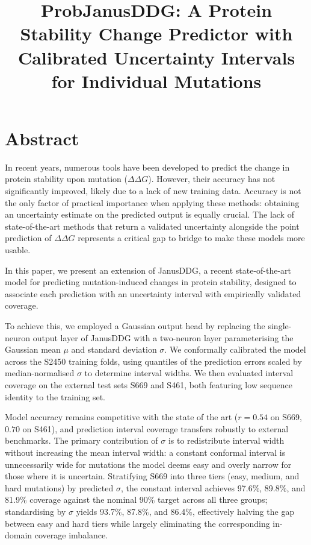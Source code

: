 \documentclass[11pt,a4paper]{article}
\title{ProbJanusDDG: A Protein Stability Change Predictor with Calibrated Uncertainty Intervals for Individual Mutations}
\author{}
\begin{document}
\maketitle
\vspace{-10mm}




\section{Abstract}
In recent years, numerous tools have been developed to predict the change in protein stability upon mutation ($\Delta\Delta G$). However, their accuracy has not significantly improved, likely due to a lack of new training data. Accuracy is not the only factor of practical importance when applying these methods: obtaining an uncertainty estimate on the predicted output is equally crucial. The lack of state-of-the-art methods that return a validated uncertainty alongside the point prediction of $\Delta\Delta G$ represents a critical gap to bridge to make these models more usable.


In this paper, we present an extension of JanusDDG, a recent state-of-the-art model for predicting mutation-induced changes in protein stability, designed to associate each prediction with an uncertainty interval with empirically validated coverage.

To achieve this, we employed a Gaussian output head by replacing the single-neuron output layer of JanusDDG with a two-neuron layer parameterising the Gaussian mean $\mu$ and standard deviation $\sigma$. 
We conformally calibrated the model across the S2450 training folds, using quantiles of the prediction errors scaled by median-normalised $\sigma$ to determine interval widths. We then
evaluated interval coverage on the external test sets S669 and S461, both featuring low sequence identity to the training set.


Model accuracy remains competitive with the state of the art ($r=0.54$ on S669, $0.70$ on S461), and prediction interval coverage transfers robustly to external benchmarks. The primary contribution of $\sigma$ is to redistribute interval width without increasing the mean interval width: a constant conformal interval is unnecessarily wide for mutations the model deems easy and overly narrow for those where it is uncertain. Stratifying S669 into three tiers (easy, medium, and hard mutations) by predicted $\sigma$, the constant interval achieves 97.6\%, 89.8\%, and 81.9\% coverage against the nominal 90\% target across all three groups; standardising by $\sigma$ yields 93.7\%, 87.8\%, and 86.4\%, effectively halving the gap between easy and hard tiers while largely eliminating the corresponding in-domain coverage imbalance.
\end{document}
